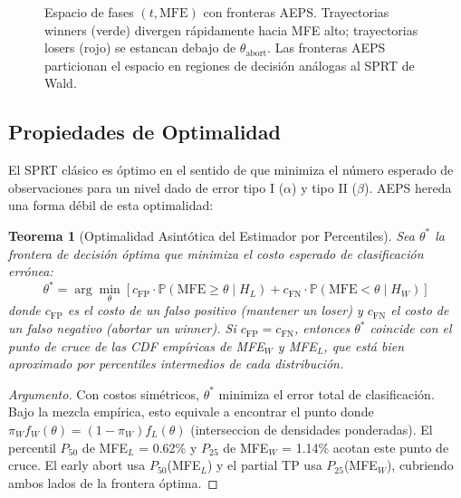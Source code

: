 \documentclass[11pt,a4paper]{article}
\newtheorem{theorem}{Teorema}[section]
\newcommand{\Prob}{\mathbb{P}}
\begin{document}
\begin{figure}[H]
\caption{Espacio de fases $(t, \text{MFE})$ con fronteras AEPS.
Trayectorias winners (verde) divergen r\'apidamente hacia MFE alto;
trayectorias losers (rojo) se estancan debajo de $\theta_{\text{abort}}$.
Las fronteras AEPS particionan el espacio en regiones de decisi\'on
an\'alogas al SPRT de Wald.}
\label{fig:phase_space}
\end{figure}


\subsection{Propiedades de Optimalidad}

El SPRT cl\'asico es \'optimo en el sentido de que minimiza el
n\'umero esperado de observaciones para un nivel dado de error
tipo I ($\alpha$) y tipo II ($\beta$). AEPS hereda una forma
d\'ebil de esta optimalidad:

\begin{theorem}[Optimalidad Asint\'otica del Estimador por Percentiles]
\label{thm:optimality}
Sea $\theta^*$ la frontera de decisi\'on \'optima que minimiza
el costo esperado de clasificaci\'on err\'onea:
\begin{equation}
\theta^* = \arg\min_\theta \left[
  c_{\text{FP}} \cdot \Prob(\text{MFE} \geq \theta \mid H_L) +
  c_{\text{FN}} \cdot \Prob(\text{MFE} < \theta \mid H_W)
\right]
\label{eq:optimal_boundary}
\end{equation}
donde $c_{\text{FP}}$ es el costo de un falso positivo (mantener un
loser) y $c_{\text{FN}}$ el costo de un falso negativo (abortar un
winner). Si $c_{\text{FP}} = c_{\text{FN}}$, entonces $\theta^*$
coincide con el punto de cruce de las CDF emp\'iricas de MFE$_W$ y
MFE$_L$, que est\'a bien aproximado por percentiles intermedios
de cada distribuci\'on.
\end{theorem}

\begin{proof}[Argumento]
Con costos sim\'etricos, $\theta^*$ minimiza el error total de
clasificaci\'on. Bajo la mezcla emp\'irica, esto equivale a encontrar
el punto donde $\pi_W f_W(\theta) = (1-\pi_W) f_L(\theta)$
(interseccion de densidades ponderadas). El percentil $P_{50}$
de MFE$_L$ = 0.62\% y $P_{25}$ de MFE$_W$ = 1.14\% acotan
este punto de cruce. El early abort usa $P_{50}$(MFE$_L$) y
el partial TP usa $P_{25}$(MFE$_W$), cubriendo ambos lados
de la frontera \'optima.
\end{proof}
\end{document}
